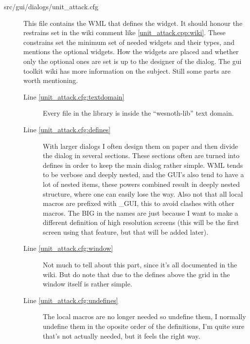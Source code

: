 \begin{description}
\item[src/gui/dialogs/unit\_attack.cfg]
	This file contains the WML that defines the widget. It should honour the
restrains set in the wiki comment like \ref{unit_attack.cpp:wiki}. These
constrains set the minimum set of needed widgets and their types, and mentions
the optional widgets. How the widgets are placed and whether only the optional
ones are set is up to the designer of the dialog. The gui toolkit wiki has more
information on the subject. Still some parts are worth mentioning.

	\begin{description}
	\item[Line \ref{unit_attack.cfg:textdomain}]
		Every file in the library is inside the ``wesnoth-lib'' text domain.

	\item[Line \ref{unit_attack.cfg:defines}]
		With larger dialogs I often design them on paper and then divide the
dialog in several sections. These sections often are turned into defines in
order to keep the main dialog rather simple. WML tends to be verbose and deeply
nested, and the GUI's also tend to have a lot of nested items, these powers
combined result in deeply nested structure, where one can easily lose the way.
Also not that all local macros are prefixed with \_GUI, this to avoid clashes
with other macros. The BIG in the names are just because I want to make a
different definition of high resolution screens (this will be the first screen
using that feature, but that will be added later).

	\item[Line \ref{unit_attack.cfg:window}]
		Not much to tell about this part, since it's all documented in the wiki.
But do note that due to the defines above the grid in the window itself is
rather simple.

	\item[Line \ref{unit_attack.cfg:undefines}]
		The local macros are no longer needed so undefine them, I normally
undefine them in the oposite order of the definitions, I'm quite sure that's not
actually needed, but it feels the right way\texttrademark.

	\end{description}

\end{description}

